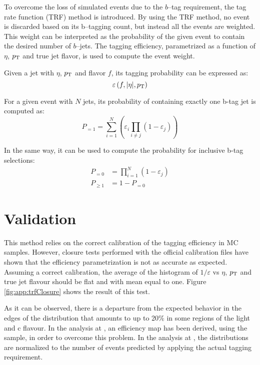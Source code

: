 To overcome the loss of simulated events due to the $b$--tag
requirement, the tag rate function (TRF) method is introduced. By
using the TRF method, no event is discarded based on its b--tagging
count, but instead all the events are weighted.  This weight can be
interpreted as the probability of the given event to contain the
desired number of $b$--jets.  The tagging efficiency, parametrized as a
function of $\eta$, $p_{\mathrm{T}}$ and true jet flavor, is used to compute
the event weight.

Given a jet with $\eta$, $p_{\mathrm{T}}$ and flavor $f$, its tagging
probability can be expressed as:
\begin{equation*}
	\varepsilon \left(f,|\eta|,p_{\mathrm{T}}\right)
\end{equation*}

For a given event with $N$ jets, its probability of containing exactly
one b-tag jet is computed as:
\begin{equation*}
	P_{=1} = \sum\limits_{i=1}^N \left( \varepsilon_{i}
    \prod\limits_{i \neq j} \left( 1 - \varepsilon_{j} \right) \right)
\end{equation*}

In the same way, it can be used to compute the probability for
inclusive b-tag selections:
\begin{align*}
	P_{=0} &= \prod\limits_{i=1}^N \left( 1 - \varepsilon_{j} \right) \\
	P_{\geq 1} &= 1 - P_{=0}
\end{align*}

\section{Validation}
This method relies on the correct calibration of the tagging
efficiency in MC samples.  However, closure tests performed with the
official calibration files have shown that the efficiency
parametrization is not as accurate as expected.  Assuming a correct
calibration, the average of the histogram of $1/\varepsilon$ vs
$\eta$, $p_{\mathrm{T}}$ and true jet flavour should be flat and with mean equal
to one.  Figure \ref{fig:app:trfClosure} shows the result of this test.

As it can be observed, there is a departure from the expected behavior
in the edges of the distribution that amounts to up to 20\% in some
regions of the light and c flavour.  In the analysis at \seventev{}, an
efficiency map has been derived, using the \mcatnlo{} sample, in order
to overcome this problem. In the analysis at \eighttev{}, the
distributions are normalized to the number of events predicted by
applying the actual tagging requirement.

